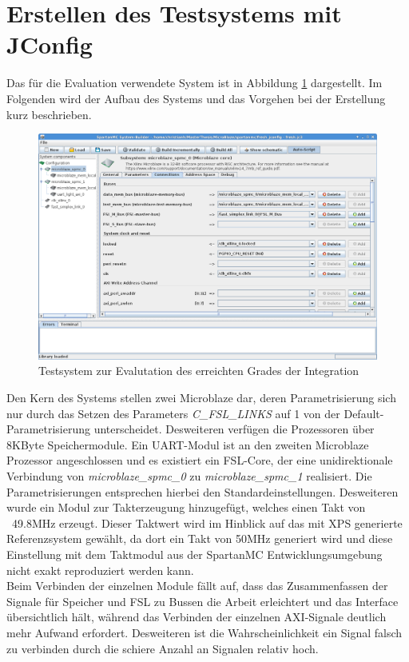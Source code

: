 \section{Erstellen des Testsystems mit JConfig}
Das für die Evaluation verwendete System ist in Abbildung \ref{fig:Testsystem} dargestellt. Im Folgenden wird der Aufbau des Systems und das Vorgehen bei der Erstellung kurz beschrieben.
\begin{figure}[th!]
	\centering
	\includegraphics[width=1\linewidth]{./bilder/Testsystem}
	\caption{Testsystem zur Evalutation des erreichten Grades der Integration}
	\label{fig:Testsystem}
\end{figure}
Den Kern des Systems stellen zwei Microblaze dar, deren Parametrisierung sich nur durch das Setzen des Parameters \textit{C\_FSL\_LINKS} auf 1 von der Default-Parametrisierung unterscheidet. Desweiteren verfügen die Prozessoren über 8KByte Speichermodule. Ein UART-Modul ist an den zweiten Microblaze Prozessor angeschlossen und es existiert ein FSL-Core, der eine unidirektionale Verbindung von \textit{microblaze\_spmc\_0} zu \textit{microblaze\_spmc\_1} realisiert. Die Parametrisierungen entsprechen hierbei den Standardeinstellungen. Desweiteren wurde ein Modul zur Takterzeugung hinzugefügt, welches einen Takt von ~49.8MHz erzeugt. Dieser Taktwert wird im Hinblick auf das mit XPS generierte Referenzsystem gewählt, da  dort ein Takt von 50MHz generiert wird und diese Einstellung mit dem Taktmodul aus der SpartanMC Entwicklungsumgebung nicht exakt reproduziert werden kann.\\
Beim Verbinden der einzelnen Module fällt auf, dass das Zusammenfassen der Signale für Speicher und FSL zu Bussen die Arbeit erleichtert und das Interface übersichtlich hält, während das Verbinden der einzelnen AXI-Signale deutlich mehr Aufwand erfordert. Desweiteren ist die Wahrscheinlichkeit ein Signal falsch zu verbinden durch die schiere Anzahl an Signalen relativ hoch.\\
